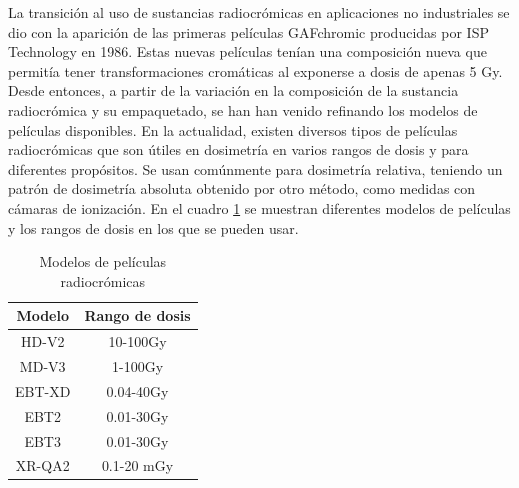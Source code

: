 La transición al uso de sustancias radiocrómicas en aplicaciones no industriales se dio con la aparición de las primeras películas GAFchromic producidas por ISP Technology en 1986. Estas nuevas películas tenían una composición nueva que permitía tener transformaciones cromáticas al exponerse a dosis de apenas 5 Gy\cite{Williams2011}.\\


Desde entonces, a partir de la variación en la composición de la sustancia radiocrómica y su empaquetado, se han han venido refinando los modelos de películas disponibles. En la actualidad, existen diversos tipos de películas radiocrómicas que son útiles en dosimetría en varios rangos de dosis y para diferentes propósitos. Se usan comúnmente para dosimetría relativa, teniendo un patrón de dosimetría absoluta obtenido por otro método, como medidas con cámaras de ionización. En el cuadro \ref{tab:Modelos} se muestran diferentes modelos de películas y los rangos de dosis en los que se pueden usar.\\
\begin{table}[h!]
	\centering
	\begin{tabular}{|c|c|}
		
		\hline 
		Modelo & Rango de dosis \\ 
		\hline 
		HD-V2 & 10-100Gy \\ 
		\hline 
		MD-V3 & 1-100Gy \\ 
		\hline 
		EBT-XD & 0.04-40Gy \\ 
		\hline 
		EBT2 & 0.01-30Gy \\ 
		\hline 
		EBT3 & 0.01-30Gy \\ 
		\hline 
		XR-QA2 & 0.1-20 mGy \\ 
		\hline 
	\end{tabular} 
\caption{Modelos de películas radiocrómicas}
\label{tab:Modelos}
\end{table}

